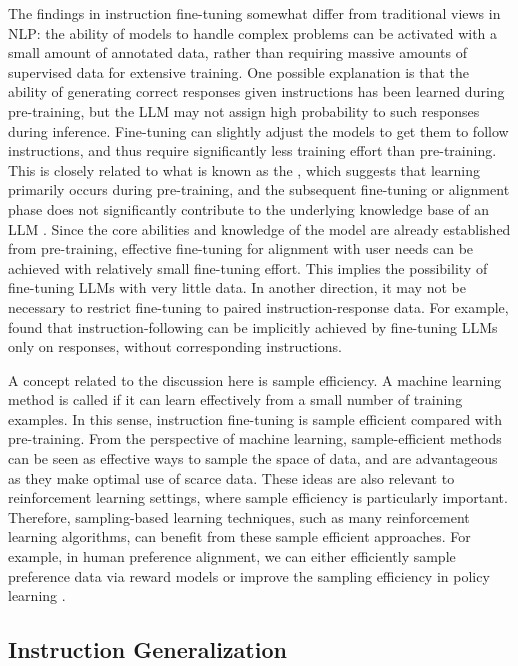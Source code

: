 The findings in instruction fine-tuning somewhat differ from traditional views in NLP: the ability of models to handle complex problems can be activated with a small amount of annotated data, rather than requiring massive amounts of supervised data for extensive training. One possible explanation is that the ability of generating correct responses given instructions has been learned during pre-training, but the LLM may not assign high probability to such responses during inference. Fine-tuning can slightly adjust the models to get them to follow instructions, and thus require significantly less training effort than pre-training. This is closely related to what is known as the , which suggests that learning primarily occurs during pre-training, and the subsequent fine-tuning or alignment phase does not significantly contribute to the underlying knowledge base of an LLM \cite{zhou-etal:2023lima}. Since the core abilities and knowledge of the model are already established from pre-training, effective fine-tuning for alignment with user needs can be achieved with relatively small fine-tuning effort. This implies the possibility of fine-tuning LLMs with very little data. In another direction, it may not be necessary to restrict fine-tuning to paired instruction-response data. For example, \citet{hewitt-etal:2024instruction} found that instruction-following can be implicitly achieved by fine-tuning LLMs only on responses, without corresponding instructions.

A concept related to the discussion here is sample efficiency. A machine learning method is called  if it can learn effectively from a small number of training examples. In this sense, instruction fine-tuning is sample efficient compared with pre-training. From the perspective of machine learning, sample-efficient methods can be seen as effective ways to sample the space of data, and are advantageous as they make optimal use of scarce data. These ideas are also relevant to reinforcement learning settings, where sample efficiency is particularly important. Therefore, sampling-based learning techniques, such as many reinforcement learning algorithms, can benefit from these sample efficient approaches. For example, in human preference alignment, we can either efficiently sample preference data via reward models \cite{liu-etal:2024statistical} or improve the sampling efficiency in policy learning \cite{wang-etal:2024esrl}.

\subsection{Instruction Generalization}
\label{sec:instruction-generalization}

